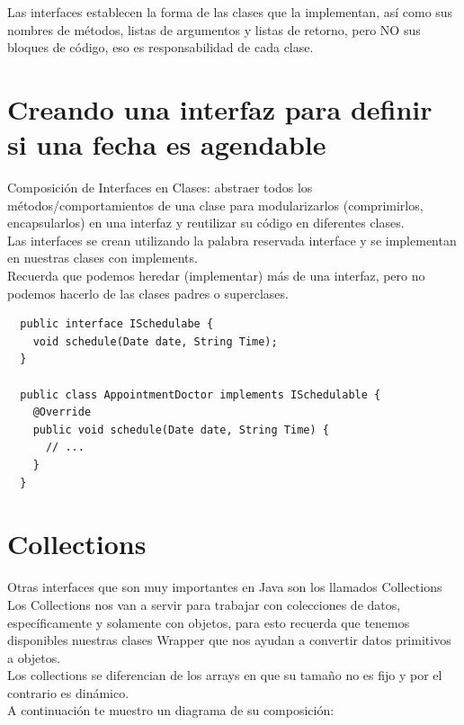 \documentclass{article}
\begin{document}
Las interfaces establecen la forma de las clases que la implementan, así como
sus nombres de métodos, listas de argumentos y listas de retorno, pero NO sus
bloques de código, eso es responsabilidad de cada clase.\\


\section{Creando una interfaz para definir si una fecha es agendable}%
Composición de Interfaces en Clases: abstraer todos los métodos/comportamientos
de una clase para modularizarlos (comprimirlos, encapsularlos) en una interfaz
y reutilizar su código en diferentes clases.\\

Las interfaces se crean utilizando la palabra reservada interface y se
implementan en nuestras clases con implements.\\

Recuerda que podemos heredar (implementar) más de una interfaz, pero no podemos
hacerlo de las clases padres o superclases.\\

\begin{verbatim}
  public interface ISchedulabe {
    void schedule(Date date, String Time);
  }

  public class AppointmentDoctor implements ISchedulable {
    @Override
    public void schedule(Date date, String Time) {
      // ...
    }
  }
\end{verbatim}


\section{Collections}%
Otras interfaces que son muy importantes en Java son los llamados Collections\\

Los Collections nos van a servir para trabajar con colecciones de datos,
específicamente y solamente con objetos, para esto recuerda que tenemos
disponibles nuestras clases Wrapper que nos ayudan a convertir datos primitivos
a objetos.\\

Los collections se diferencian de los arrays en que su tamaño no es fijo y por
el contrario es dinámico.\\

A continuación te muestro un diagrama de su composición:\\
\end{document}
